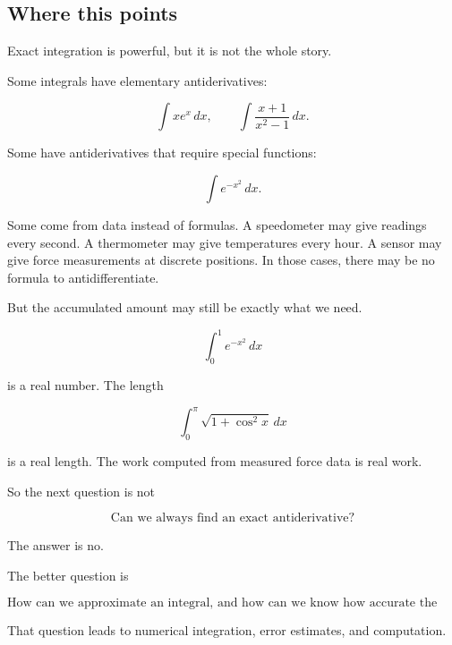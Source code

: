 \subsection{Where this points}
\label{subsec:chapter-11-hook-numerical-integration}

Exact integration is powerful, but it is not the whole story.

Some integrals have elementary antiderivatives:

\[
\int x e^x\,dx,
\qquad
\int \frac{x+1}{x^2-1}\,dx.
\]

Some have antiderivatives that require special functions:

\[
\int e^{-x^2}\,dx.
\]

Some come from data instead of formulas.  A speedometer may give readings every
second.  A thermometer may give temperatures every hour.  A sensor may give force
measurements at discrete positions.  In those cases, there may be no formula to
antidifferentiate.

But the accumulated amount may still be exactly what we need.

\[
\int_0^1 e^{-x^2}\,dx
\]

is a real number.  The length

\[
\int_0^\pi \sqrt{1+\cos^2x}\,dx
\]

is a real length.  The work computed from measured force data is real work.

So the next question is not

\[
\text{Can we always find an exact antiderivative?}
\]

The answer is no.

The better question is

\[
\boxed{
\text{How can we approximate an integral, and how can we know how accurate the approximation is?}
}
\]

That question leads to numerical integration, error estimates, and computation.